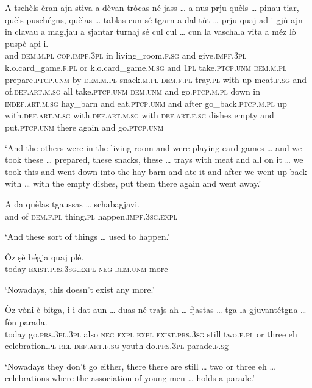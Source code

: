 \begin{linenumbers}
	\gll    A tschèls èran ajn stiva a dèvan tròcas né jass … a nus prju quèls … pinau tiar, quèls puschégns, quèlas … tablas cun sé tgarn a dal tùt … prju quaj ad i gjù ajn in clavau a magljau a sjantar turnaj sé cul cul … cun la vaschala vita a méz lò puspè api i.\\
	and \textsc{dem.m.pl} \textsc{cop.impf.3pl} in living\_room.\textsc{f.sg} and give.\textsc{impf.3pl} k.o.card\_game.\textsc{f.pl} or k.o.card\_game.\textsc{m.sg} {} and \textsc{1pl} take.\textsc{ptcp.unm} \textsc{dem.m.pl} {} prepare.\textsc{ptcp.unm} by \textsc{dem.m.pl} snack.\textsc{m.pl}  \textsc{dem.f.pl} {} tray.\textsc{pl} with up meat.\textsc{f.sg} and of.\textsc{def.art.m.sg} all {} take.\textsc{ptcp.unm} \textsc{dem.unm} and go.\textsc{ptcp.m.pl} down in \textsc{indef.art.m.sg} hay\_barn and eat.\textsc{ptcp.unm} and after go\_back.\textsc{ptcp.m.pl} up with.\textsc{def.art.m.sg} with.\textsc{def.art.m.sg} {} with \textsc{def.art.f.sg} dishes empty and put.\textsc{ptcp.unm} there again and go.\textsc{ptcp.unm}\\
\end{linenumbers}
\medskip
\glt `And the others were in the living room and were playing card games … and we took these … prepared, these snacks, these … trays with meat and all on it … we took this and went down into the hay barn and ate it and after we went up back with … with the empty dishes, put them there again and went away.'
\medskip

\begin{linenumbers}
	\gll    A da quèlas tgaussas …  schabagjavi.\\
	and of  \textsc{dem.f.pl} thing.\textsc{pl} {} happen.\textsc{impf.3sg.expl}\\
\end{linenumbers}
\medskip
\glt `And these sort of things … used to happen.'
\medskip

\begin{linenumbers}
	\gll    Òz ṣè bégja quaj plé.\\
	today \textsc{exist.prs.3sg.expl} \textsc{neg} \textsc{dem.unm} more \\
\end{linenumbers}
\medskip
\glt `Nowadays, this doesn’t exist any more.'
\medskip

\begin{linenumbers}
	\gll    Òz vòni è bitga, i i dat aun … duas né trajs ah … fjastas … tga la gjuvantétgna … fòn parada.\\
	today go.\textsc{prs.3pl.3pl} also \textsc{neg} \textsc{expl} \textsc{expl} \textsc{exist.prs.3sg} still {} two.\textsc{f.pl} or three eh {} celebration.\textsc{pl} {} \textsc{rel} \textsc{def.art.f.sg} youth {} do.\textsc{prs.3pl} parade.\textsc{f.s}g\\
\end{linenumbers}
\medskip
\glt `Nowadays they don’t go either, there there are still … two or three eh … celebrations where the association of young men … holds a parade.'
\medskip


